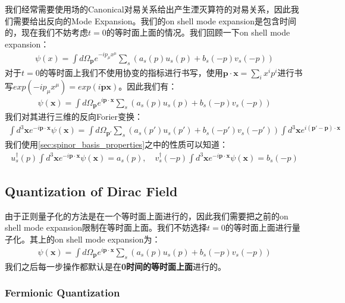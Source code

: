 \bigskip
{}

我们经常需要使用场的Canonical对易关系给出产生湮灭算符的对易关系，因此我们需要给出反向的Mode Expansion。我们的on
shell mode expansion是包含时间的，现在我们不妨考虑$ t = 0 $的等时面上面的情况。我们回顾一下on shell
mode expansion：
\begin{align}
  \psi(x)=\int d\Omega_\mathbf{p}e^{- ip_\mu
  x^\mu}\sum_s\left(a_s(p)u_s(p)+b_s(-p)v_s(-p)\right)
\end{align}
对于$ t = 0 $的等时面上我们不使用协变的指标进行书写，使用$ \mathbf{p}\cdot \mathbf{x} =
\sum_i x^ip^i $进行书写$ exp(-ip_\mu x^\mu) = exp(i\mathbf{px}) $。因此我们有：
\begin{align}
  \psi(\mathbf{x})=\int d\Omega_\mathbf{p}e^{i\mathbf{p}\cdot
  \mathbf{x}}\sum_s\left(a_s(p)u_s(p)+b_s(-p)v_s(-p)\right)
\end{align}
我们对其进行三维的反向Forier变换：
\begin{align}
  \int d^3\mathbf{x}e^{-i\mathbf{p}\cdot
  \mathbf{x}}\psi(\mathbf{x})=\int
  d\Omega_\mathbf{p'}\sum_s\left(a_s(p')u_s(p')+b_s(-p')v_s(-p')\right)\int
  d^3\mathbf{x}e^{i(\mathbf{p'}-\mathbf{p})\cdot \mathbf{x}}
\end{align}
我们使用\cref{sec:spinor_basis_properties}之中的性质可以知道：
\begin{align}
  u^\dagger_s(p) \int d^3\mathbf{x}e^{-i\mathbf{p}\cdot
  \mathbf{x}}\psi(\mathbf{x}) = a_s(p) ,\quad v^\dagger_s(-p) \int
  d^3\mathbf{x}e^{-i\mathbf{p}\cdot \mathbf{x}}\psi(\mathbf{x}) =
  b_s(-p)
\end{align}

\subsection{Quantization of Dirac Field}
由于正则量子化的方法是在一个等时面上面进行的，因此我们需要把之前的on shell mode
expansion限制在等时面上面。我们不妨选择$ t  = 0 $的等时面上面进行量子化。其上的on shell mode expansion为：
\begin{align}
  \psi(\mathbf{x})=\int d\Omega_\mathbf{p}e^{i\mathbf{p}\cdot
  \mathbf{x}}\sum_s\left(a_s(p)u_s(p)+b_s(-p)v_s(-p)\right)
\end{align}
我们之后每一步操作都默认是在\textbf{0时间的等时面上面}进行的。

\subsubsection{Fermionic Quantization}

